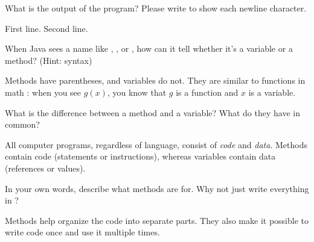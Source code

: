 \Q What is the output of the program? Please write \java{\\n} to show each newline character.

\begin{answer}[8em]
\vspace{-1ex}
\begin{javaans}
First line.\n
\n
\n
\n
Second line.\n
\end{javaans}
\end{answer}


\Q When Java sees a name like , , or , how can it tell whether it's a variable or a method? (Hint: syntax)

\begin{answer}[5em]
Methods have parentheses, and variables do not.
They are similar to functions in math  : when you see $g(x)$, you know that $g$ is a function and $x$ is a variable.
\end{answer}


\Q What is the difference between a method and a variable? What do they have in common?

\begin{answer}[5em]
All computer programs, regardless of language, consist of \emph{code} and \emph{data}.
Methods contain code (statements or instructions), whereas variables contain data (references or values).
\end{answer}


\Q In your own words, describe what methods are for. Why not just write everything in ?

\begin{answer}[5em]
Methods help organize the code into separate parts.
They also make it possible to write code once and use it multiple times.
\end{answer}
